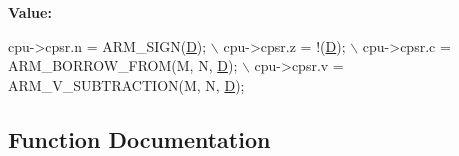 {\bfseries Value\+:}
\begin{DoxyCode}
cpu->cpsr.n = ARM\_SIGN(\mbox{\hyperlink{_aes_8c_adef282f11138cda3d081cc21280a8d12}{D}}); \(\backslash\)
    cpu->cpsr.z = !(\mbox{\hyperlink{_aes_8c_adef282f11138cda3d081cc21280a8d12}{D}}); \(\backslash\)
    cpu->cpsr.c = ARM\_BORROW\_FROM(M, N, \mbox{\hyperlink{_aes_8c_adef282f11138cda3d081cc21280a8d12}{D}}); \(\backslash\)
    cpu->cpsr.v = ARM\_V\_SUBTRACTION(M, N, \mbox{\hyperlink{_aes_8c_adef282f11138cda3d081cc21280a8d12}{D}});
\end{DoxyCode}


\subsection{Function Documentation}
\mbox{\label{isa-thumb_8c_a322c6e2dfcedf8976372d68effabc1e5}} 
